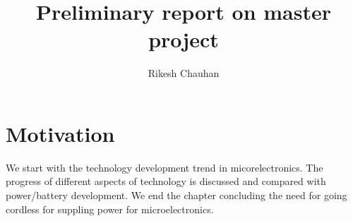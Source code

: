 \documentclass[12pt,a4paper,UKenglish]{article}
\title{Preliminary report on master project}
\author{Rikesh Chauhan}
\date{}
\begin{document}
\maketitle

% 
% 

\section{Motivation}

We start with the technology development trend in micorelectronics. The progress of different aspects of 
technology is discussed and compared with power/battery development. We end the chapter concluding the need for
going cordless for suppling power for microelectronics.
\end{document}
